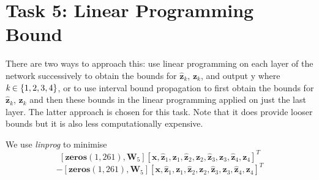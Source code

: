 \documentclass[11pt]{article}
\begin{document}
\section{Task 5: Linear Programming Bound}
\label{sec:Task 5}

There are two ways to approach this: use linear programming on each layer of the network successively to obtain the bounds for $\hat{ \textbf{z}}_{k}$, $\textbf{z}_{k}$, and output y where $\emph{k}\in{\{1,2,3,4\}}$, or to use interval bound propagation to first obtain the bounds for $\hat{ \textbf{z}}_{k}$, $\textbf{z}_{k}$ and then these bounds in the linear programming applied on just the last layer. The latter approach is chosen for this task. Note that it does provide looser bounds but it is also less computationally expensive. 

We use \emph{linprog} to minimise 
\[
[\textbf{zeros}(1,261),\textbf{W}_{5}] [\textbf{x},\hat{ \textbf{z}}_{1},\textbf{z}_{1},\hat{ \textbf{z}}_{2},\textbf{z}_{2},\hat{ \textbf{z}}_{3},\textbf{z}_{3},\hat{ \textbf{z}}_{4},\textbf{z}_{4}]^T
\]
\[
-[\textbf{zeros}(1,261),\textbf{W}_{5}] [\textbf{x},\hat{ \textbf{z}}_{1},\textbf{z}_{1},\hat{ \textbf{z}}_{2},\textbf{z}_{2},\hat{ \textbf{z}}_{3},\textbf{z}_{3},\hat{ \textbf{z}}_{4},\textbf{z}_{4}]^T
\]
\end{document}

